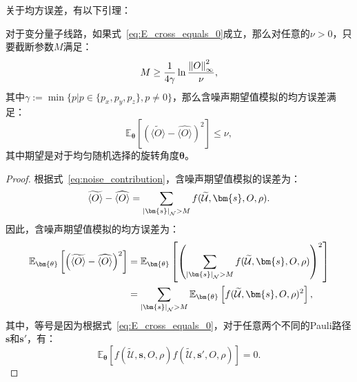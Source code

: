 关于均方误差，有以下引理：
\begin{lemma}\label{lemma:MSE_l}
    对于变分量子线路，如果式~\eqref{eq:E_cross_equals_0}成立，那么对任意的$\nu > 0$，只要截断参数$M$满足：
    \begin{equation}
        M\geq\frac{1}{4\gamma}\ln{\frac{\norm{O}_\infty^2}{\nu}},
    \end{equation}
    其中$\gamma:=\min\{p|{p \in \{p_x,p_y,p_z\},p\neq 0}\}$，那么含噪声期望值模拟的均方误差满足：
    \begin{equation}
        \mathbb{E}_{\bm{\theta}}\left[\left(\widetilde{\langle O\rangle}-\widehat{\langle O\rangle}\right)^2\right]\leq\nu,
    \end{equation}
    其中期望是对于均匀随机选择的旋转角度$\bm{\theta}$。
\end{lemma}
\begin{proof}
    根据式~\eqref{eq:noise_contribution}，含噪声期望值模拟的误差为：
    \begin{equation}
        \widetilde{\langle O\rangle}-\widehat{\langle O\rangle}=\sum_{\abs{\bm{s}}_{\mathcal{N}}>M}f(\widetilde{\mathcal{U}},\bm{s},O,\rho).
    \end{equation}
    因此，含噪声期望值模拟的均方误差为：
    \begin{equation}
        \begin{aligned}
            \mathbb{E}_{\bm{\theta}}\left[\left(\widetilde{\langle O\rangle}-\widehat{\langle O\rangle}\right)^2\right]&=\mathbb{E}_{\bm{\theta}}\left[\left(\sum_{\abs{\bm{s}}_{\mathcal{N}}>M}f(\widetilde{\mathcal{U}},\bm{s},O,\rho)\right)^2\right]\\
            &=\sum_{\abs{\bm{s}}_{\mathcal{N}}>M}\mathbb{E}_{\bm{\theta}}\left[f(\widetilde{\mathcal{U}},\bm{s},O,\rho)^2\right],
        \end{aligned}
    \end{equation}
    其中，等号是因为根据式~\eqref{eq:E_cross_equals_0}，对于任意两个不同的Pauli路径$\bm{s}$和$\bm{s}'$，有：
    \begin{equation}
        \mathbb{E}_{\bm{\theta}}\left[f(\widetilde{\mathcal{U}},\bm{s},O,\rho)f(\widetilde{\mathcal{U}},\bm{s}',O,\rho)\right]=0.
    \end{equation}
    

\end{proof}
